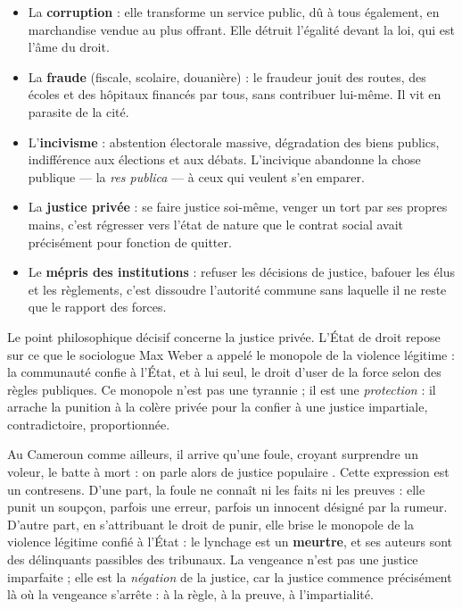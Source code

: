 \documentclass[11pt]{article}
\begin{document}
\begin{itemize}
\item La \textbf{corruption} : elle transforme un service public, dû à tous également, en marchandise vendue au plus offrant. Elle détruit l'égalité devant la loi, qui est l'âme du droit.
\item La \textbf{fraude} (fiscale, scolaire, douanière) : le fraudeur jouit des routes, des écoles et des hôpitaux financés par tous, sans contribuer lui-même. Il vit en parasite de la cité.
\item L'\textbf{incivisme} : abstention électorale massive, dégradation des biens publics, indifférence aux élections et aux débats. L'incivique abandonne la chose publique — la \emph{res publica} — à ceux qui veulent s'en emparer.
\item La \textbf{justice privée} : se faire justice soi-même, venger un tort par ses propres mains, c'est régresser vers l'état de nature que le contrat social avait précisément pour fonction de quitter.
\item Le \textbf{mépris des institutions} : refuser les décisions de justice, bafouer les élus et les règlements, c'est dissoudre l'autorité commune sans laquelle il ne reste que le rapport des forces.
\end{itemize}

Le point philosophique décisif concerne la justice privée. L'État de droit repose sur ce que le sociologue Max Weber a appelé le monopole de la violence légitime : la communauté confie à l'État, et à lui seul, le droit d'user de la force selon des règles publiques. Ce monopole n'est pas une tyrannie ; il est une \emph{protection} : il arrache la punition à la colère privée pour la confier à une justice impartiale, contradictoire, proportionnée.

\begin{savaistu}
Au Cameroun comme ailleurs, il arrive qu'une foule, croyant surprendre un voleur, le batte à mort : on parle alors de \guillemotleft justice populaire \guillemotright. Cette expression est un contresens. D'une part, la foule ne connaît ni les faits ni les preuves : elle punit un soupçon, parfois une erreur, parfois un innocent désigné par la rumeur. D'autre part, en s'attribuant le droit de punir, elle brise le monopole de la violence légitime confié à l'État : le lynchage est un \textbf{meurtre}, et ses auteurs sont des délinquants passibles des tribunaux. La vengeance n'est pas une justice imparfaite ; elle est la \emph{négation} de la justice, car la justice commence précisément là où la vengeance s'arrête : à la règle, à la preuve, à l'impartialité.
\end{savaistu}
\end{document}
